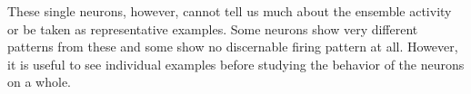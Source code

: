 \documentclass[11pt,a4paper]{article}
\begin{document}
These single neurons, however, cannot tell us much about the ensemble activity or be taken as representative examples. Some neurons show very different patterns from these and some show no discernable firing pattern at all. However, it is useful to see individual examples before studying the behavior of the neurons on a whole.

\begin{figure}[h]
        \noindent{}
\end{figure}
\end{document}
